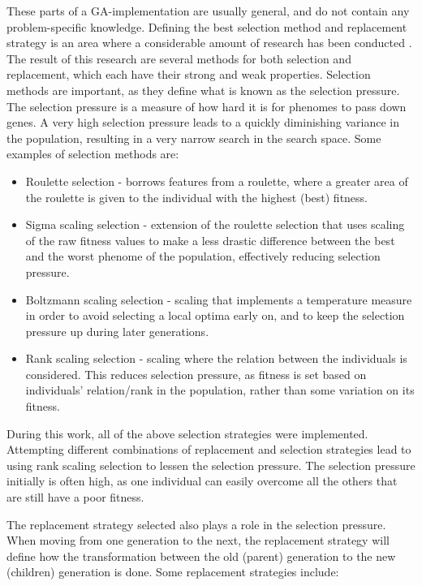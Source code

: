 \documentclass[10pt,a4paper]{book}
\begin{document}
These parts of a \gls{GA}-implementation are usually general, and do not contain any problem-specific knowledge. Defining the best selection method and replacement strategy is an area where a considerable amount of research has been conducted \cite{goldberg1988genetic}. The result of this research are several methods for both selection and replacement, which each have their strong and weak properties. Selection methods are important, as they define what is known as the selection pressure. The selection pressure is a measure of how hard it is for phenomes to pass down genes. A very high selection pressure leads to a quickly diminishing variance in the population, resulting in a very narrow search in the search space. Some examples of selection methods are:

\begin{itemize}
\item Roulette selection - borrows features from a roulette, where a greater area of the roulette is given to the individual with the highest (best) fitness.
\item Sigma scaling selection - extension of the roulette selection that uses scaling of the raw fitness values to make a less drastic difference between the best and the worst phenome of the population, effectively reducing selection pressure.
\item Boltzmann scaling selection - scaling that implements a temperature measure in order to avoid selecting a local optima early on, and to keep the selection pressure up during later generations.
\item Rank scaling selection - scaling where the relation between the individuals is considered. This reduces selection pressure, as fitness is set based on individuals' relation/rank in the population, rather than some variation on its fitness.
\end{itemize}

During this work, all of the above selection strategies were implemented. Attempting different combinations of replacement and selection strategies lead to using rank scaling selection to lessen the selection pressure. The selection pressure initially is often high, as one individual can easily overcome all the others that are still have a poor fitness.

The replacement strategy selected also plays a role in the selection pressure. When moving from one generation to the next, the replacement strategy will define how the transformation between the old (parent) generation to the new (children) generation is done. Some replacement strategies include:
\end{document}
